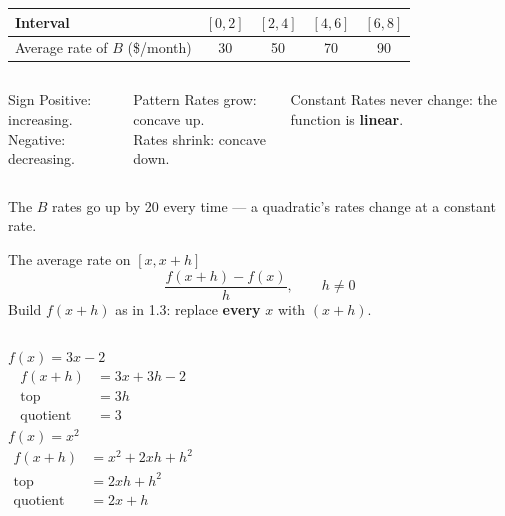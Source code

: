 \documentclass[aspectratio=169, 11pt]{beamer}
\begin{document}
\begin{frame}[t, plain]

  \begin{center}
  \begin{tabular}{|l|c|c|c|c|}
  \hline
  Interval & \([0, 2]\) & \([2, 4]\) & \([4, 6]\) & \([6, 8]\) \\ \hline
  Average rate of \(B\) (\$/month) & 30 & 50 & 70 & 90 \\ \hline
  \end{tabular}
  \end{center}

  \medskip
  \begin{columns}[T]
      \begin{block}{Sign}
        Positive: increasing.\\ Negative: decreasing.
      \end{block}
      \begin{block}{Pattern}
        Rates grow: concave up.\\ Rates shrink: concave down.
      \end{block}
      \begin{block}{Constant}
        Rates never change: the function is \textbf{linear}.
      \end{block}
  \end{columns}

  \medskip
  The \(B\) rates go up by 20 every time --- a quadratic's rates change at a constant rate.
\end{frame}

\begin{frame}[t, plain]

  \begin{block}{The average rate on \([x, x + h]\)}
    \[ \frac{f(x + h) - f(x)}{h}, \qquad h \ne 0 \]
    Build \(f(x + h)\) as in 1.3: replace \textbf{every} \(x\) with \((x + h)\).
  \end{block}

  \begin{columns}[T]
      \textbf{\(f(x) = 3x - 2\)}
      \begin{align*}
        f(x + h) &= 3x + 3h - 2 \\
        \text{top} &= 3h \\
        \text{quotient} &= 3
      \end{align*}
      \textbf{\(f(x) = x^2\)}
      \begin{align*}
        f(x + h) &= x^2 + 2xh + h^2 \\
        \text{top} &= 2xh + h^2 \\
        \text{quotient} &= 2x + h
      \end{align*}
  \end{columns}
\end{frame}
\end{document}
